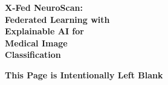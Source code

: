 \documentclass[openany, 12pt]{book}
\begin{document}
	\vspace*{\fill} %
	\thispagestyle{empty}
	\begin{center} %
		\begin{minipage}{0.8\textwidth} %
			\centering %
			{\fontsize{30pt}{20pt}\sffamily\bfseries\selectfont
				X-Fed NeuroScan: 
				\\[20pt]Federated Learning with 
				\\[10pt] Explainable AI for
				\\[10pt] Medical Image
				\\[10pt] Classification
			}
		\end{minipage}
	\end{center}
	\vfill %
	\newpage
	
	
	\vspace*{\fill} %
	\thispagestyle{empty}
	\begin{center} %
		\begin{minipage}{0.8\textwidth} %
			\centering %
			\textbf{This Page is Intentionally Left Blank}
		\end{minipage}
	\end{center}
	\vfill %
	\newpage
	
\end{document}
